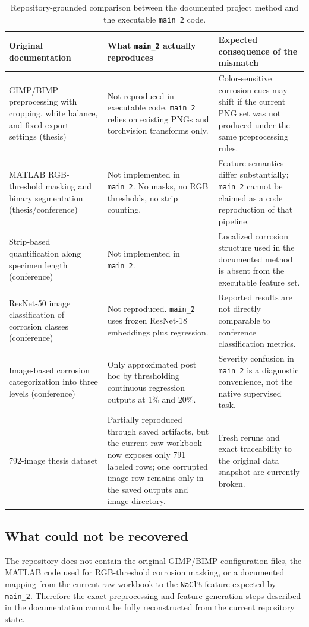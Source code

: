 \documentclass[11pt]{article}
\begin{document}
\begin{table}[H]
\centering
\small
\begin{tabularx}{\textwidth}{p{} p{} Y}
\toprule
\textbf{Original documentation} & \textbf{What \texttt{main\_2} actually reproduces} & \textbf{Expected consequence of the mismatch} \\
\midrule
GIMP/BIMP preprocessing with cropping, white balance, and fixed export settings (thesis) & Not reproduced in executable code. \texttt{main\_2} relies on existing PNGs and torchvision transforms only. & Color-sensitive corrosion cues may shift if the current PNG set was not produced under the same preprocessing rules. \\
MATLAB RGB-threshold masking and binary segmentation (thesis/conference) & Not implemented in \texttt{main\_2}. No masks, no RGB thresholds, no strip counting. & Feature semantics differ substantially; \texttt{main\_2} cannot be claimed as a code reproduction of that pipeline. \\
Strip-based quantification along specimen length (conference) & Not implemented in \texttt{main\_2}. & Localized corrosion structure used in the documented method is absent from the executable feature set. \\
ResNet-50 image classification of corrosion classes (conference) & Not reproduced. \texttt{main\_2} uses frozen ResNet-18 embeddings plus regression. & Reported results are not directly comparable to conference classification metrics. \\
Image-based corrosion categorization into three levels (conference) & Only approximated post hoc by thresholding continuous regression outputs at 1\% and 20\%. & Severity confusion in \texttt{main\_2} is a diagnostic convenience, not the native supervised task. \\
792-image thesis dataset & Partially reproduced through saved artifacts, but the current raw workbook now exposes only 791 labeled rows; one corrupted image row remains only in the saved outputs and image directory. & Fresh reruns and exact traceability to the original data snapshot are currently broken. \\
\bottomrule
\end{tabularx}
\caption{Repository-grounded comparison between the documented project method and the executable \texttt{main\_2} code.}
\label{tab:traceability}
\end{table}

\subsection{What could not be recovered}
The repository does not contain the original GIMP/BIMP configuration files, the MATLAB code used for RGB-threshold corrosion masking, or a documented mapping from the current raw workbook to the \texttt{NaCl\%} feature expected by \texttt{main\_2}. Therefore the exact preprocessing and feature-generation steps described in the documentation cannot be fully reconstructed from the current repository state.
\end{document}
